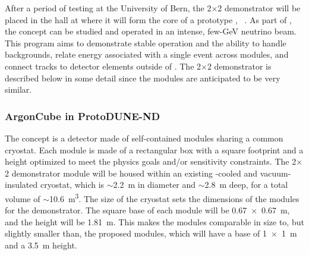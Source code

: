 After a period of testing at the University of Bern, the  2$\times$2 demonstrator will be placed in the    hall at  where it will form the core of a prototype   , ~\cite{bib:docdb12571}.   As part of  , the  concept can be studied and operated in an intense, few-GeV neutrino beam.  This program aims to demonstrate stable operation and the ability to handle backgrounds, relate energy associated with a single event across  modules, and connect tracks to detector elements outside of .  The  2$\times$2 demonstrator is described below in some detail since the    modules are anticipated to be very similar.


\subsubsection{ArgonCube in ProtoDUNE-ND}
\label{sec:appx-nd:2x2-design}


The   concept is a detector made of self-contained  modules sharing a common cryostat. Each module is made of a rectangular box with a square footprint and a height optimized to meet the physics goals and/or sensitivity constraints. The  2$\times$2 demonstrator module will be housed within an existing \lntwo-cooled and vacuum-insulated cryostat, 
which is $\sim$\SI{2.2}{\metre} in diameter and $\sim$\SI{2.8}{\metre} deep, for a total volume of $\sim$\SI{10.6}{\metre\cubed}. The size of the cryostat sets the dimensions of the modules for the demonstrator. The square base of each module will be \SI{0.67 x 0.67}{\metre}, and the height will be \SI{1.81}{\metre}. This makes the modules comparable in size to, but slightly smaller than, the proposed     modules, which will have a base of \SI{1 x 1}{\metre} and a \SI{3.5}{\metre} height.

